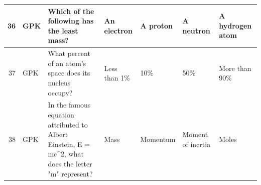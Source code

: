 \documentclass[10pt]{article}
\begin{document}
\begin{tiny}
\begin{longtable}{r|p{0.375in}|p{1.275in}|p{0.75in}|p{0.75in}|p{0.75in}|p{0.75in}}
    36    &      GPK &                                                                                                                                                                                                                                       Which of the following has the least mass? &                                                                                                                           An electron &                                                                                              A proton &                                                                                                                  A neutron &                                                                                                                   A hydrogen atom \\\hline
    37    &      GPK &                                                                                                                                                                                                                         What percent of an atom's space does its nucleus occupy? &                                                                                                                          Less than 1\% &                                                                                                   10\% &                                                                                                                        50\% &                                                                                                                     More than 90\% \\\hline
    38    &      GPK &                                                                                                                                                                              In the famous equation attributed to Albert Einstein, E = mc\textasciicircum 2, what does the letter "m" represent? &                                                                                                                                  Mass &                                                                                              Momentum &                                                                                                          Moment of inertia &                                                                                                                             Moles \\\hline

\end{longtable}
\end{tiny}
\end{document}
